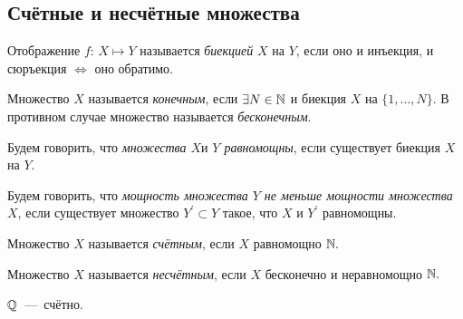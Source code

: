     \subsection{Счётные и несчётные множества}
    \begin{definition}
        Отображение $f$: $X \mapsto Y$ называется \textit{биекцией} $X$ на $Y$, если оно и инъекция, и сюръекция $\Leftrightarrow$ оно обратимо.
    \end{definition}
    \begin{definition}
        Множество $X$ называется \textit{конечным}, если $\exists N \in \mathbb{N}$ и биекция $X$ на $\{1, \dots, N \}.$ В противном случае множество называется \textit{бесконечным}.
    \end{definition}
    \begin{definition}
        Будем говорить, что \textit{множества $X \text{и } Y$ равномощны}, если существует биекция $X$ на $Y.$
    \end{definition}
    \begin{definition}
        Будем говорить, что \textit{мощность множества $Y$ не меньше мощности множества $X$}, если существует множество $Y^{'} \subset Y$ такое, что $X$ и $Y^{'}$ равномощны.
    \end{definition}
    \begin{definition}
        Множество $X$ называется \textit{счётным}, если $X$ равномощно $\mathbb{N}.$
    \end{definition}
    \begin{definition}
        Множество $X$ называется \textit{несчётным}, если $X$ бесконечно и неравномощно $\mathbb{N}.$
    \end{definition}
    \begin{theorem}
        $\mathbb{Q}$~---~счётно.
    \end{theorem}
